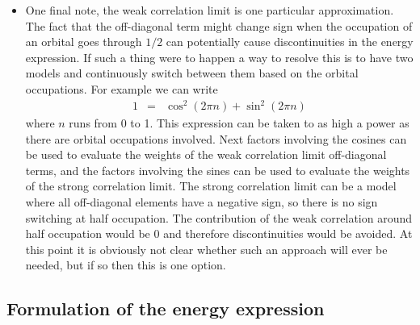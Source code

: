 \documentclass[aip,graphicx]{revtex4-1}
\begin{document}
\begin{itemize}
\item One final note, the weak correlation limit is one particular approximation. The fact that the off-diagonal term might change sign when the occupation of an orbital goes through $1/2$ can potentially cause discontinuities in the energy expression. If such a thing were to happen a way to resolve this is to have two models and continuously switch between them based on the orbital occupations. For example we can write
\begin{eqnarray}
1 &=& \cos^2(2\pi n) + \sin^2(2\pi n)
\end{eqnarray}
where $n$ runs from 0 to 1. This expression can be taken to as high a power as there are orbital occupations involved. Next factors involving the cosines can be used to evaluate the weights of the weak correlation limit off-diagonal terms, and the factors involving the sines can be used to evaluate the weights of the strong correlation limit. The strong correlation limit can be a model where all off-diagonal elements have a negative sign, so there is no sign switching at half occupation. The contribution of the weak correlation around half occupation would be 0 and therefore discontinuities would be avoided. At this point it is obviously not clear whether such an approach will ever be needed, but if so then this is one option.
\end{itemize}

\subsection{Formulation of the energy expression}
\end{document}
